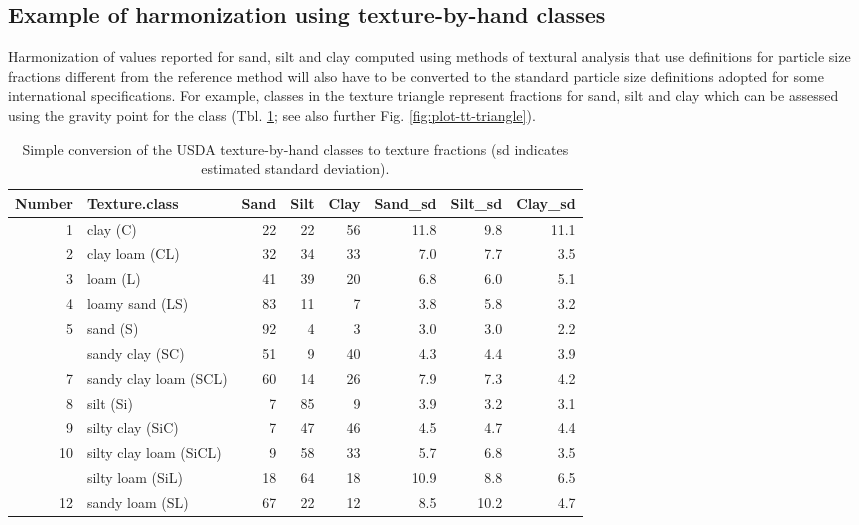 \documentclass[11pt]{krantz}
\theoremstyle{definition}
\theoremstyle{definition}
\theoremstyle{definition}
\theoremstyle{remark}
\begin{document}
\hypertarget{example-of-harmonization-using-texture-by-hand-classes}{%
\subsection{Example of harmonization using texture-by-hand
classes}\label{example-of-harmonization-using-texture-by-hand-classes}}

Harmonization of values reported for sand, silt and clay computed using
methods of textural analysis that use definitions for particle size
fractions different from the reference method will also have to be
converted to the standard particle size definitions adopted for some
international specifications. For example, classes in the texture
triangle represent fractions for sand, silt and clay which can be
assessed using the gravity point for the class (Tbl.
\ref{tab:usdatexturec}; see also further Fig.
\ref{fig:plot-tt-triangle}).

\begin{table}

\caption{\label{tab:usdatexturec}Simple conversion of the USDA texture-by-hand classes to texture fractions (sd indicates estimated standard deviation).}
\centering
\begin{tabular}[t]{rlrrrrrr}
\toprule
Number & Texture.class & Sand & Silt & Clay & Sand\_sd & Silt\_sd & Clay\_sd\\
\midrule
1 & clay (C) & 22 & 22 & 56 & 11.8 & 9.8 & 11.1\\
2 & clay loam (CL) & 32 & 34 & 33 & 7.0 & 7.7 & 3.5\\
3 & loam (L) & 41 & 39 & 20 & 6.8 & 6.0 & 5.1\\
4 & loamy sand (LS) & 83 & 11 & 7 & 3.8 & 5.8 & 3.2\\
5 & sand (S) & 92 & 4 & 3 & 3.0 & 3.0 & 2.2\\
\addlinespace
6 & sandy clay (SC) & 51 & 9 & 40 & 4.3 & 4.4 & 3.9\\
7 & sandy clay loam (SCL) & 60 & 14 & 26 & 7.9 & 7.3 & 4.2\\
8 & silt (Si) & 7 & 85 & 9 & 3.9 & 3.2 & 3.1\\
9 & silty clay (SiC) & 7 & 47 & 46 & 4.5 & 4.7 & 4.4\\
10 & silty clay loam (SiCL) & 9 & 58 & 33 & 5.7 & 6.8 & 3.5\\
\addlinespace
11 & silty loam (SiL) & 18 & 64 & 18 & 10.9 & 8.8 & 6.5\\
12 & sandy loam (SL) & 67 & 22 & 12 & 8.5 & 10.2 & 4.7\\
\bottomrule
\end{tabular}
\end{table}
\end{document}
